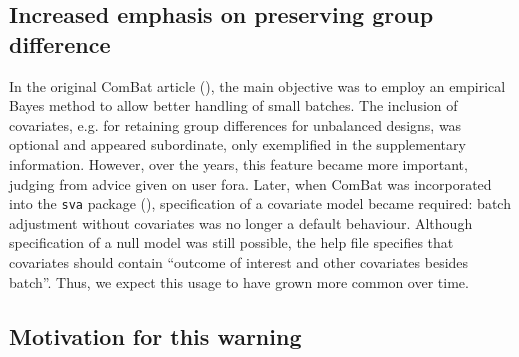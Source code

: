 \documentclass{bio}
\begin{document}
\subsection{Increased emphasis on preserving group difference}

In the original ComBat article (\citealp{Johnson2007}), the main objective was to employ an empirical Bayes method to allow better handling of small batches. The inclusion of covariates, e.g. for retaining group differences for unbalanced designs, was optional and appeared subordinate, only exemplified in the supplementary information. However, over the years, this feature became more important, judging from advice given on user fora.
Later, when ComBat was incorporated into the \texttt{sva} package (\citealp{Leek2012}), specification of a covariate model became required: batch adjustment without covariates was no longer a default behaviour. Although specification of a null model was still possible, the help file specifies that covariates should contain ``outcome of interest and other covariates besides batch''. Thus, we expect this usage to have grown more common over time.

\subsection{Motivation for this warning}
\end{document}
